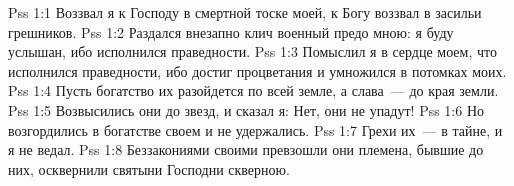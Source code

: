 \vs Pss 1:1
Воззвал я к Господу в смертной тоске моей, к Богу воззвал в засильи
грешников.
\vs Pss 1:2
Раздался внезапно клич военный предо мною: я буду услышан, ибо
исполнился праведности.
\vs Pss 1:3
Помыслил я в сердце моем, что исполнился праведности, ибо
достиг процветания и умножился в потомках моих.
\vs Pss 1:4
Пусть богатство их разойдется по всей земле, а слава~--- до
края земли.
\vs Pss 1:5
Возвысились они до звезд, и сказал я: Нет, они не упадут!
\vs Pss 1:6
Но возгордились в богатстве своем и не удержались.
\vs Pss 1:7
Грехи их~--- в тайне, и я не ведал.
\vs Pss 1:8
Беззакониями своими превзошли они племена, бывшие до них,
осквернили святыни Господни скверною.

